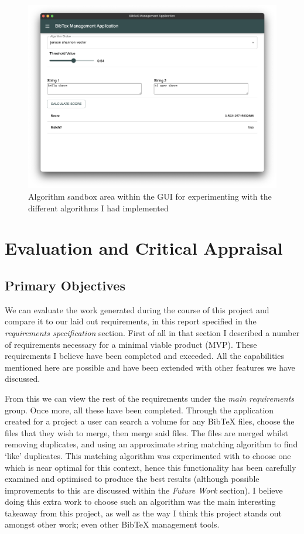 \documentclass[a4paper,11pt]{article}
\begin{document}
\begin{figure}
    \centering
    \includegraphics[width=0.8\linewidth]{images/algorithmPlayroom.png}
    \caption{Algorithm sandbox area within the GUI for experimenting with the different algorithms I had implemented}
    \label{fig:algorithmSandbox}
\end{figure}


\section{Evaluation and Critical Appraisal}
\subsection{Primary Objectives}
We can evaluate the work generated during the course of this project and compare it to our laid out requirements, in this report specified in the \textit{requirements specification} section. First of all in that section I described a number of requirements necessary for a minimal viable product (MVP). These requirements I believe have been completed and exceeded. All the capabilities mentioned here are possible and have been extended with other features we have discussed.

From this we can view the rest of the requirements under the \textit{main requirements} group. Once more, all these have been completed. Through the application created for a project a user can search a volume for any BibTeX files, choose the files that they wish to merge, then merge said files. The files are merged whilst removing duplicates, and using an approximate string matching algorithm to find `like' duplicates. This matching algorithm was experimented with to choose one which is near optimal for this context, hence this functionality has been carefully examined and optimised to produce the best results (although possible improvements to this are discussed within the \textit{Future Work} section). I believe doing this extra work to choose such an algorithm was the main interesting takeaway from this project, as well as the way I think this project stands out amongst other work; even other BibTeX management tools.
\end{document}
